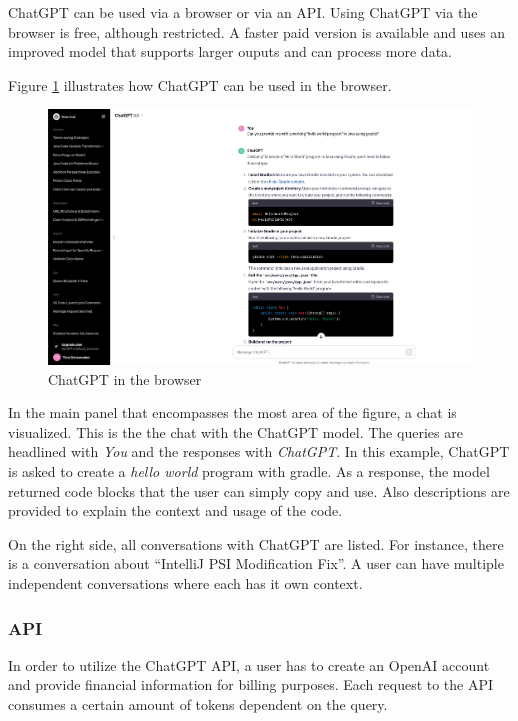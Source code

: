 ChatGPT can be used via a browser or via an \ac{API}. Using ChatGPT via the browser is free, although restricted. A faster paid version is available and uses an improved model that supports larger ouputs and can process more data.

Figure \ref{fig:chatgpt_browser} illustrates how ChatGPT can be used in the browser.
\begin{figure}
    \centering
\includegraphics[width=\columnwidth]{figures/chapter2/chatgpt_browser.png}
    \caption{ChatGPT in the browser}
    \label{fig:chatgpt_browser}
\end{figure}
In the main panel that encompasses the most area of the figure, a chat is visualized. This is the the chat with the ChatGPT model. The queries are headlined with \textit{You} and the responses with \textit{ChatGPT}. In this example, ChatGPT is asked to create a \textit{hello world} program with gradle. As a response, the model returned code blocks that the user can simply copy and use. Also descriptions are provided to explain the context and usage of the code.

On the right side, all conversations with ChatGPT are listed. For instance, there is a conversation about \enquote{IntelliJ PSI Modification Fix}. A user can have multiple independent conversations where each has it own context. 

\subsubsection{API}
In order to utilize the ChatGPT \ac{API}, a user has to create an OpenAI account and provide financial information for billing purposes. Each request to the API consumes a certain amount of tokens dependent on the query. 

